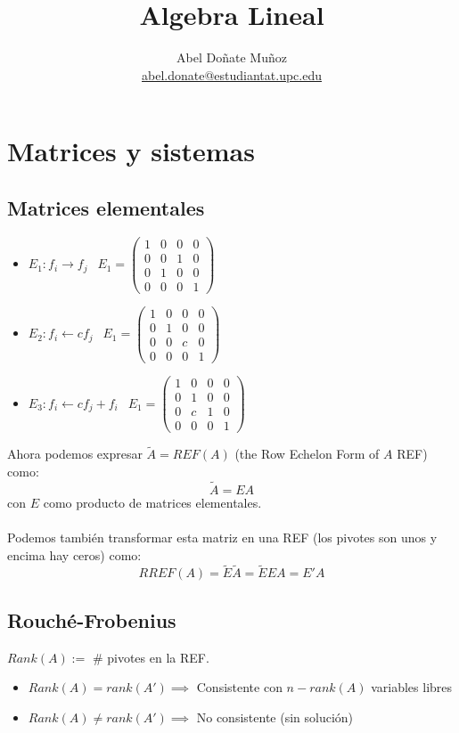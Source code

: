 \documentclass[12pt]{article}
\title{Algebra Lineal}
\author{Abel Doñate Muñoz \\ \small{\href{mailto:abel.donate@estudiantat.upc.edu}{abel.donate@estudiantat.upc.edu}}}
\date{}
\begin{document}
\maketitle
\tableofcontents
\newpage

\section{Matrices y sistemas}

\subsection{Matrices elementales}
\begin{itemize}
  \item \(E_1: f_i \to f_j \ \ \)
  	$E_1 = \begin{pmatrix} 
	1 & 0 & 0 & 0  \\
    0 & 0 & 1 &  0\\
    0 &  1 &    0   &  0 \\
    0 & 0 &    0   &  1
	\end{pmatrix}$
	
  \item \(E_2: f_i \gets cf_j \ \ \)
  	$E_1 = \begin{pmatrix} 
	1 & 0 & 0 & 0  \\
    0 & 1 & 0 &  0\\
    0 &  0 &    c   &  0 \\
    0 & 0 &    0   &  1
	\end{pmatrix}$
	
  \item \(E_3: f_i \gets cf_j +f_i \ \ \)
  	$E_1 = \begin{pmatrix} 
	1 & 0 & 0 & 0  \\
    0 & 1 & 0 &  0\\
    0 &  c &    1   &  0 \\
    0 & 0 &    0   &  1
	\end{pmatrix}$
  
\end{itemize}
Ahora podemos expresar $\tilde{A} = REF(A)$ (the Row Echelon Form of $A$ REF) como: \[\tilde{A}=EA\] con $E$ como producto de matrices elementales. \\ 
\\
Podemos también transformar esta matriz en una REF (los pivotes son unos y encima hay ceros) como: 
\[RREF(A)=\tilde{E}\tilde{A}=\tilde{E}EA=E'A\]

\subsection{Rouché-Frobenius}
$Rank(A):=$ \# pivotes en la REF.
\begin{itemize}
  \item $Rank(A)=rank(A') \implies$ Consistente con $n-rank(A)$ variables libres
  \item $Rank(A) \neq rank(A') \implies$ No consistente (sin solución)
\end{itemize}
\end{document}
